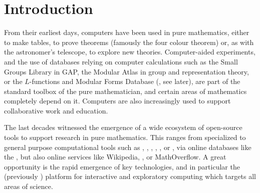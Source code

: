 \section{Introduction}


From their earliest days, computers have been used in pure mathematics, either to make
tables, to prove theorems (famously the four colour theorem) or, as with the astronomer's
telescope, to explore new theories. Computer-aided experiments, and the use of databases
relying on computer calculations such as the Small Groups Library in GAP, the Modular
Atlas in group and representation theory, or the $L$-functions and Modular Forms Database (\LMFDB, see later), are part of the standard
toolbox of the pure mathematician, and certain areas of mathematics completely depend on
it. Computers are also increasingly used to support collaborative work and education.

The last decades witnessed the emergence of a wide ecosystem of open-source tools to
support research in pure mathematics. This ranges from specialized to general purpose
computational tools such as \GAP, \PariGP, \Linbox, \MPIR, \Sage, or \Singular, via online
databases like the \LMFDB, but also online services like Wikipedia,
\Arxiv, or MathOverflow. A great opportunity is the rapid emergence of key technologies,
and in particular the \Jupyter (previously \IPython) platform for interactive and
exploratory computing which targets all areas of science.

